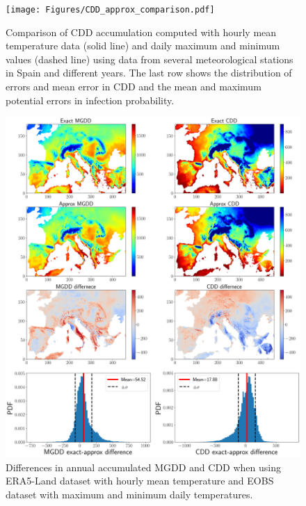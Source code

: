 \begin{figure}[H]
    \centering
    \texttt{[image: Figures/CDD\_approx\_comparison.pdf]}
    \caption{Comparison of CDD accumulation computed with hourly mean
        temperature data (solid line) and daily maximum and minimum values
        (dashed
        line) using data from several meteorological stations in Spain and
        different
        years. The last row shows the distribution of errors and mean error in
        CDD and
        the mean and maximum potential errors in infection probability.}
    \label{fig:CDD_app}
\end{figure}

\begin{figure}[H]
    \centering
    \includegraphics[width=\textwidth]{Figures/E-OBS_vs_ERA5.pdf}
    \caption{Differences in annual accumulated MGDD and CDD when using
        ERA5-Land dataset with hourly mean temperature and EOBS dataset with
        maximum
        and minimum daily temperatures.}
    \label{fig:EOBS_vs_ERA5}
\end{figure}
